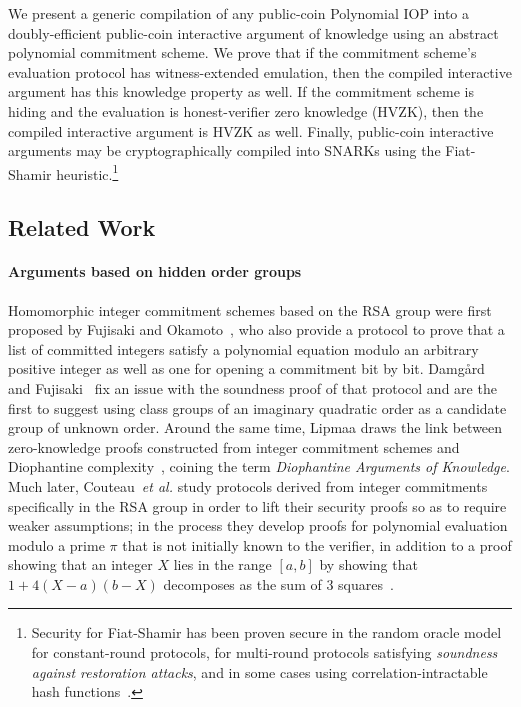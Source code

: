 We present a generic compilation of any public-coin Polynomial IOP into a doubly-efficient public-coin interactive argument of knowledge using an abstract polynomial commitment scheme. We prove that if the commitment scheme's evaluation protocol has witness-extended emulation, then the compiled interactive argument has this knowledge property as well. If the commitment scheme is hiding and the evaluation is honest-verifier zero knowledge (HVZK), then the compiled interactive argument is HVZK as well. Finally, public-coin interactive arguments may be cryptographically compiled into SNARKs using the Fiat-Shamir heuristic.\footnote{Security for Fiat-Shamir has been proven secure in the random oracle model for constant-round protocols, for multi-round protocols satisfying \emph{soundness against restoration attacks}, and in some cases using correlation-intractable hash functions~\cite{C:FiaSha86,CCS:BelRog93,EC:PoiSte96,CSproofs,TCC:HalMyeRac08,TCC:BenChiSpo16,EC:AABN02,C:KalRotRot17,EC:CCRR18,FOCS:HolLom18,STOC:CCHLRRW19}.}

\subsection{Related Work}

\paragraph{Arguments based on hidden order groups} 
Homomorphic integer commitment schemes based on the RSA group were first proposed by Fujisaki and Okamoto~\cite{C:FujOka97}, who also provide a protocol to prove that a list of committed integers satisfy a polynomial equation modulo an arbitrary positive integer as well as one for opening a commitment bit by bit. Damgård and Fujisaki~\cite{AC:DamFuj02} fix an issue with the soundness proof of that protocol and are the first to suggest using class groups of an imaginary quadratic order as a candidate group of unknown order. Around the same time, Lipmaa draws the link between zero-knowledge proofs constructed from integer commitment schemes and Diophantine complexity~\cite{AC:Lipmaa03b}, coining the term \emph{Diophantine Arguments of Knowledge}. Much later, Couteau~\emph{et al.} study protocols derived from integer commitments specifically in the RSA group in order to lift their security proofs so as to require weaker assumptions; in the process they develop proofs for polynomial evaluation modulo a prime $\pi$ that is not initially known to the verifier, in addition to a proof showing that an integer $X$ lies in the range $[a,b]$ by showing that $1+4(X-a)(b-X)$ decomposes as the sum of 3 squares~\cite{EC:CouPetPoi17}.


